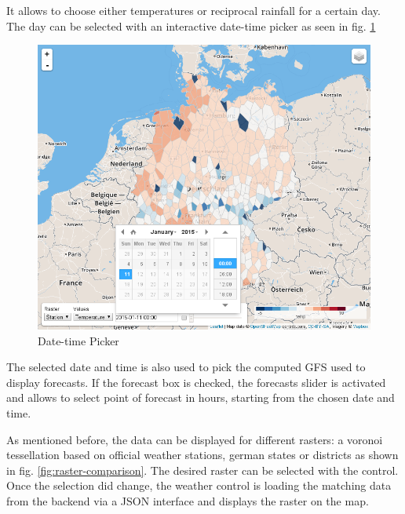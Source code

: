\documentclass[paper=a4, fontsize=11pt]{scrartcl} %
\numberwithin{equation}{section} %
\numberwithin{figure}{section} %
\numberwithin{table}{section} %
\begin{document}
\newpage
It allows to choose either temperatures or reciprocal rainfall for a
certain day. The day can be selected with an interactive date-time picker
as seen in fig. \ref{fig:date-time-picker}

\begin{figure}[htbp]
\centering
\includegraphics[width=1\textwidth]{pictures/screenshot-control-datetime.png}
\caption{Date-time Picker}
\label{fig:date-time-picker}
\end{figure}

The selected date and time is also used to pick the computed GFS used to
display forecasts. If the forecast box is checked, the forecasts slider
is activated and allows to select point of forecast in hours, starting
from the chosen date and time.

\newpage
As mentioned before, the data can be displayed for different rasters: a
voronoi tessellation based on official weather stations, german states or
districts as shown in fig. \ref{fig:raster-comparison}. The desired raster can be selected with the control. Once the
selection did change, the weather control is loading the matching data
from the backend via a JSON interface and displays the raster on the
map.
\end{document}
